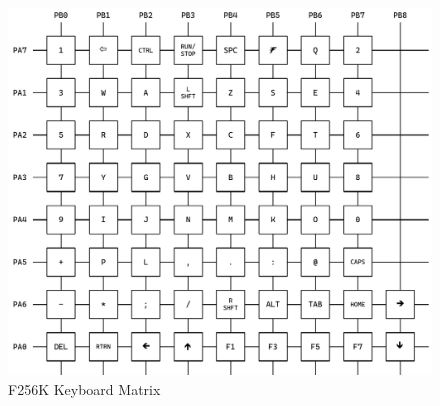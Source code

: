 \begin{figure}[ht]
    \begin{center}
        \includegraphics[scale=0.5]{images/f256k_matrix.pdf}
    \end{center}
    \caption{F256K Keyboard Matrix}
    \label{fig:f256k_matrix}
\end{figure}

